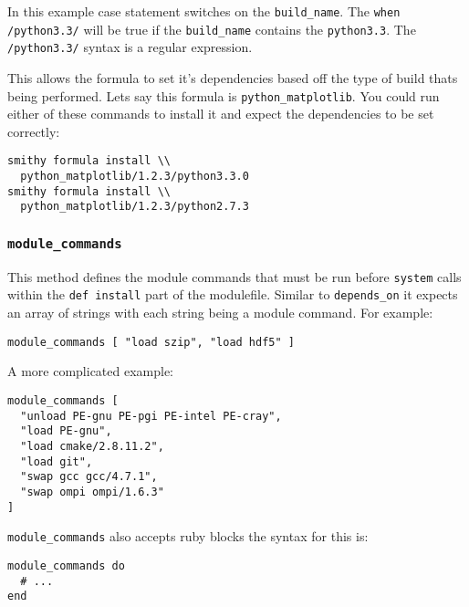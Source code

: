 \documentclass{acm_proc_article-sp}
\begin{document}
In this example case statement switches on the \texttt{build\_name}. The
\texttt{when /python3.3/} will be true if the \texttt{build\_name} contains the
\texttt{python3.3}. The
\texttt{/python3.3/} syntax is a regular expression.

This allows the formula to set it's dependencies based off the type of build
thats being performed. Lets say this formula is \texttt{python\_matplotlib}. You could
run either of these commands to install it and expect the dependencies to be set
correctly:

\begin{quoting}
\begin{verbatim}
smithy formula install \\
  python_matplotlib/1.2.3/python3.3.0
smithy formula install \\
  python_matplotlib/1.2.3/python2.7.3
\end{verbatim}
\end{quoting}

\subsubsection{\texttt{module\_commands}}

This method defines the module commands that must be run before \texttt{system}
calls within the \texttt{def install} part of the modulefile. Similar to
\texttt{depends\_on} it expects an array of strings with each string being a
module command. For example:

\begin{quoting}
\begin{verbatim}
module_commands [ "load szip", "load hdf5" ]
\end{verbatim}
\end{quoting}

A more complicated example:

\begin{quoting}
\begin{verbatim}
module_commands [
  "unload PE-gnu PE-pgi PE-intel PE-cray",
  "load PE-gnu",
  "load cmake/2.8.11.2",
  "load git",
  "swap gcc gcc/4.7.1",
  "swap ompi ompi/1.6.3"
]
\end{verbatim}
\end{quoting}

\texttt{module\_commands} also accepts ruby blocks the syntax for this is:

\begin{quoting}
\begin{verbatim}
module_commands do
  # ...
end
\end{verbatim}
\end{quoting}
\end{document}
